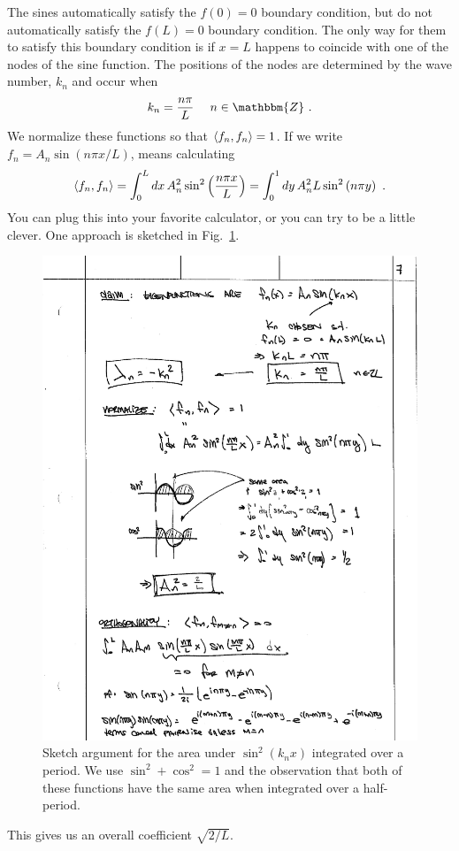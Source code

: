 \documentclass[12pt, oneside]{report}    %
\begin{document}
The sines automatically satisfy the $f(0)=0$ boundary condition, but do not automatically satisfy the $f(L)=0$ boundary condition. The only way for them to satisfy this boundary condition is if $x=L$ happens to coincide with one of the nodes of the sine function. The positions of the nodes are determined by the wave number, $k_n$ and occur when
\begin{align}
    k_n &= \frac{n\pi}{L} \ 
    &
    n\in \mathbbm{Z} \ .
\end{align}
We normalize these functions so that $\langle f_n, f_n \rangle = 1$. If we write $f_n = A_n\sin(n\pi x/L)$, means calculating
\begin{align}
    \langle f_n, f_n \rangle = 
    \int_0^L dx\, A_n^2 \sin^2\left(\frac{n\pi x}{L}\right)
    =
    \int_0^1 dy\, A_n^2 L \sin^2\left(n\pi y\right) \ .
\end{align}
You can plug this into your favorite calculator, or you can try to be a little clever. One approach is sketched in Fig.~\ref{fig:sinecosine:area}.
\begin{figure}[tb]
    \centering
    \includegraphics[width=.7\textwidth]{figures/sinecos_area.pdf}
    \caption{Sketch argument for the area under $\sin^2(k_n x)$ integrated over a period. We use $\sin^2 + \cos^2 = 1$ and the observation that both of these functions have the same area when integrated over a half-period.}
    \label{fig:sinecosine:area}
\end{figure}
This gives us an overall coefficient $\sqrt{2/L}$.
\end{document}
